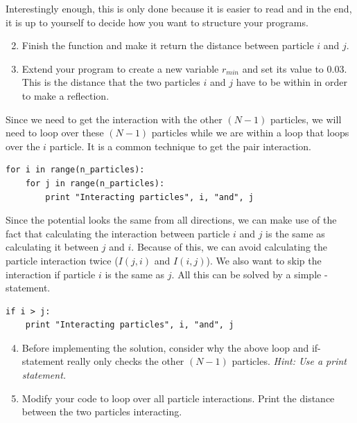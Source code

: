 \documentclass{article}
\begin{document}
Interestingly enough, this is only done because it is easier to read and in
the end, it is up to yourself to decide how you want to structure your
programs.

\begin{enumerate}
  \setcounter{enumi}{1}
  \item Finish the function  and make it return
    the distance  between particle $i$ and $j$.

  \item Extend your program to create a new variable $r_{min}$ and set its
    value to 0.03.
    This is the distance that the two particles $i$ and $j$ have to be within
    in order to make a reflection.


\end{enumerate}

Since we need to get the interaction with the other $(N-1)$ particles,
we will need to loop over these $(N-1)$ particles while we are within a loop
that loops over the $i$ particle.
It is a common technique to get the pair interaction.

\begin{lstlisting}
for i in range(n_particles):
    for j in range(n_particles):
        print "Interacting particles", i, "and", j
\end{lstlisting}

Since the potential looks the same from all directions, we can make use of the
fact that calculating the interaction between particle $i$ and $j$ is the same
as calculating it between $j$ and $i$.
Because of this, we can avoid calculating the particle interaction twice ($I(j,
i)$ and $I(i, j)$).  We also want to skip the interaction if particle $i$ is
the same as $j$.
All this can be solved by a simple -statement.

\begin{lstlisting}
if i > j:
    print "Interacting particles", i, "and", j

\end{lstlisting}

\begin{enumerate}
  \setcounter{enumi}{3}
  \item Before implementing the solution, consider why the above loop and
    if-statement really only checks the other $(N-1)$ particles. {\em Hint: Use
    a print statement.}

  \item Modify your code to loop over all particle interactions. Print the
    distance between the two particles interacting.

\end{enumerate}
\end{document}
